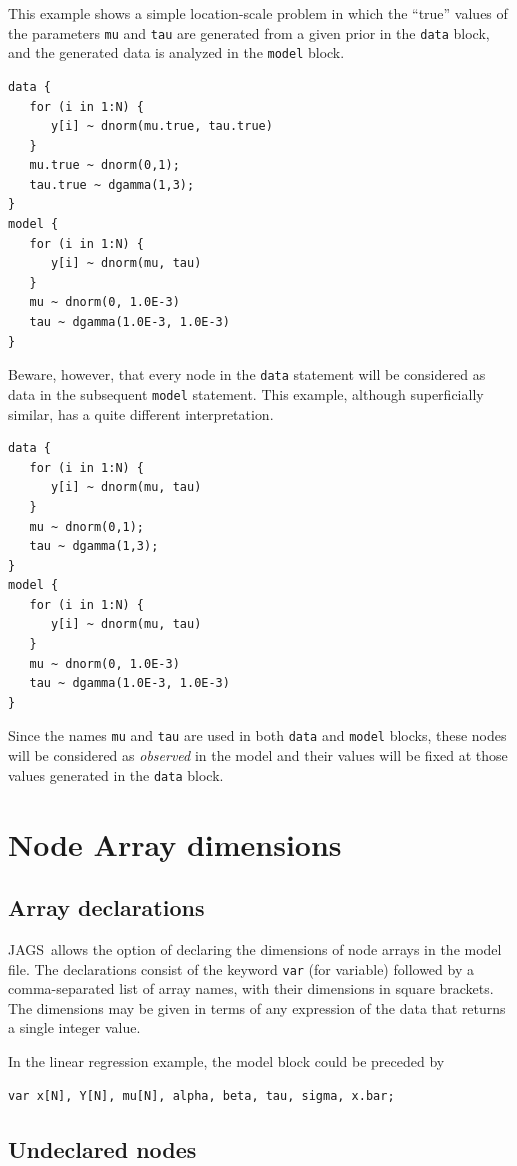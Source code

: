 \documentclass[11pt, a4paper, titlepage]{report}
\newcommand{\JAGS}{\textsf{JAGS}}
\begin{document}
This example shows a simple location-scale problem in which the ``true''
values of the parameters \texttt{mu} and \texttt{tau} are generated
from a given prior in the \texttt{data} block, and the generated
data is analyzed in the \texttt{model} block.
\begin{verbatim}
data {
   for (i in 1:N) {
      y[i] ~ dnorm(mu.true, tau.true) 
   }
   mu.true ~ dnorm(0,1);
   tau.true ~ dgamma(1,3);
}
model {
   for (i in 1:N) {     
      y[i] ~ dnorm(mu, tau)
   }
   mu ~ dnorm(0, 1.0E-3)
   tau ~ dgamma(1.0E-3, 1.0E-3)
}
\end{verbatim}
Beware, however, that every node in the \texttt{data} statement will
be considered as data in the subsequent \texttt{model} statement. This
example, although superficially similar, has a quite different interpretation.
\begin{verbatim}
data {
   for (i in 1:N) {
      y[i] ~ dnorm(mu, tau) 
   }
   mu ~ dnorm(0,1);
   tau ~ dgamma(1,3);
}
model {
   for (i in 1:N) {
      y[i] ~ dnorm(mu, tau)
   }
   mu ~ dnorm(0, 1.0E-3)
   tau ~ dgamma(1.0E-3, 1.0E-3)
}
\end{verbatim}
Since the names \texttt{mu} and \texttt{tau} are used in both
\texttt{data} and \texttt{model} blocks, these nodes will be
considered as {\em observed} in the model and their values will be
fixed at those values generated in the \texttt{data} block.

\section{Node Array dimensions}

\subsection{Array declarations}

\JAGS\ allows the option of declaring the dimensions of node arrays in
the model file. The declarations consist of the keyword \texttt{var}
(for variable) followed by a comma-separated list of array names, with
their dimensions in square brackets. The dimensions may be given in
terms of any expression of the data that returns a single integer
value.

In the linear regression example, the model block could be preceded by
\begin{verbatim}
var x[N], Y[N], mu[N], alpha, beta, tau, sigma, x.bar;
\end{verbatim}

\subsection{Undeclared nodes}
\end{document}
